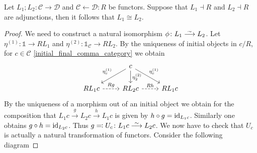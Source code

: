 \begin{prop}
    Let $L_1 ; L_2 \colon \mathcal{C} \to  \mathcal{D}$ and $\mathcal{C} \xleftarrow{}\mathcal{D}:R$ be functors.
    Suppose that $L_1 \dashv R$ and $L_2 \dashv R$ are adjunctions, then it follows that $L_1 \cong L_2$.
\end{prop}

\begin{proof}
    We need to construct a natural isomorphism $\phi \colon L_1 \isomorphism L_2$.
    Let $\eta^{(1)}\colon \mathds{1} \to RL_1$ and $\eta^{(2)} \colon \mathds{1}_{\mathcal{C}} \to RL_2$.
    By the uniqueness of initial objects in $c/R$, for $c \in \mathcal{C}$ \cref{initial_final_comma_category} we obtain 
    \[
    \begin{tikzcd}
        &
        c
        \arrow[ld, "\eta^{(1)}_c"']
        \arrow[d, "\eta^{(2)}_2"]
        \arrow[rd, "\eta^{(1)}_c"]
        &
        \\
        RL_1c
        \arrow[r, dashed, "Rg"]
        &
        RL_2c
        \arrow[r, dashed, "Rh"]
        &
        RL_1c
    \end{tikzcd}
    \]
    By the uniqueness of a morphism out of an initial object we obtain for the composition that 
    $L_1c \xrightarrow{g}L_2c \xrightarrow{h}L_1c$ 
    is given by $h \circ g = \operatorname{id}_{L_1c}$. 
    Similarly one obtains $g \circ h = \operatorname{id}_{L_2c}$.
    Thus $g \eqqcolon U_c \colon L_1c \isomorphism L_2c$.
    We now have to check that $U_c$ is actually a natural transformation of functors. Consider the following diagram
    

\end{proof}
